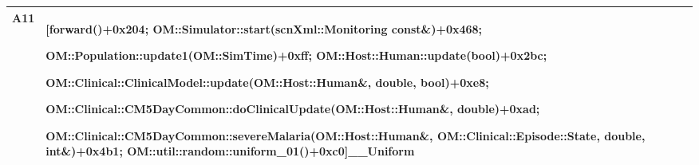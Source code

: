 \documentclass{article}
\begin{document}
\begin{table}[h!]
\begin{tabularx}{\textwidth}{@{}lX@{}}














A11 & [forward()+0x204; OM::Simulator::start(scnXml::Monitoring const\&)+0x468;

OM::Population::update1(OM::SimTime)+0xff; OM::Host::Human::update(bool)+0x2bc;

OM::Clinical::ClinicalModel::update(OM::Host::Human\&, double, bool)+0xe8;

OM::Clinical::CM5DayCommon::doClinicalUpdate(OM::Host::Human\&, double)+0xad;

OM::Clinical::CM5DayCommon::severeMalaria(OM::Host::Human\&, OM::Clinical::Episode::State, double, int\&)+0x4b1;
OM::util::random::uniform\_01()+0xc0]\_\_Uniform\\
\bottomrule
  \end{tabularx}
  \end{table}




\end{document}
